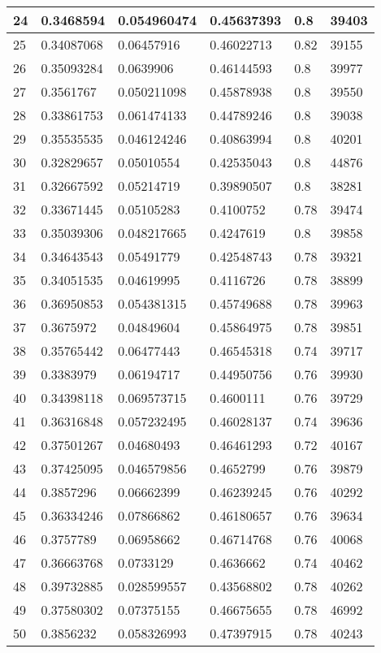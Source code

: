 \begin{longtable}{|l|l|l|l|l|l|}
24 & 0.3468594 & 0.054960474 & 0.45637393 & 0.8 & 39403 \\ \hline 
25 & 0.34087068 & 0.06457916 & 0.46022713 & 0.82 & 39155 \\ \hline 
26 & 0.35093284 & 0.0639906 & 0.46144593 & 0.8 & 39977 \\ \hline 
27 & 0.3561767 & 0.050211098 & 0.45878938 & 0.8 & 39550 \\ \hline 
28 & 0.33861753 & 0.061474133 & 0.44789246 & 0.8 & 39038 \\ \hline 
29 & 0.35535535 & 0.046124246 & 0.40863994 & 0.8 & 40201 \\ \hline 
30 & 0.32829657 & 0.05010554 & 0.42535043 & 0.8 & 44876 \\ \hline 
31 & 0.32667592 & 0.05214719 & 0.39890507 & 0.8 & 38281 \\ \hline 
32 & 0.33671445 & 0.05105283 & 0.4100752 & 0.78 & 39474 \\ \hline 
33 & 0.35039306 & 0.048217665 & 0.4247619 & 0.8 & 39858 \\ \hline 
34 & 0.34643543 & 0.05491779 & 0.42548743 & 0.78 & 39321 \\ \hline 
35 & 0.34051535 & 0.04619995 & 0.4116726 & 0.78 & 38899 \\ \hline 
36 & 0.36950853 & 0.054381315 & 0.45749688 & 0.78 & 39963 \\ \hline 
37 & 0.3675972 & 0.04849604 & 0.45864975 & 0.78 & 39851 \\ \hline 
38 & 0.35765442 & 0.06477443 & 0.46545318 & 0.74 & 39717 \\ \hline 
39 & 0.3383979 & 0.06194717 & 0.44950756 & 0.76 & 39930 \\ \hline 
40 & 0.34398118 & 0.069573715 & 0.4600111 & 0.76 & 39729 \\ \hline 
41 & 0.36316848 & 0.057232495 & 0.46028137 & 0.74 & 39636 \\ \hline 
42 & 0.37501267 & 0.04680493 & 0.46461293 & 0.72 & 40167 \\ \hline 
43 & 0.37425095 & 0.046579856 & 0.4652799 & 0.76 & 39879 \\ \hline 
44 & 0.3857296 & 0.06662399 & 0.46239245 & 0.76 & 40292 \\ \hline 
45 & 0.36334246 & 0.07866862 & 0.46180657 & 0.76 & 39634 \\ \hline 
46 & 0.3757789 & 0.06958662 & 0.46714768 & 0.76 & 40068 \\ \hline 
47 & 0.36663768 & 0.0733129 & 0.4636662 & 0.74 & 40462 \\ \hline 
48 & 0.39732885 & 0.028599557 & 0.43568802 & 0.78 & 40262 \\ \hline 
49 & 0.37580302 & 0.07375155 & 0.46675655 & 0.78 & 46992 \\ \hline 
50 & 0.3856232 & 0.058326993 & 0.47397915 & 0.78 & 40243 \\ \hline 
\end{longtable}